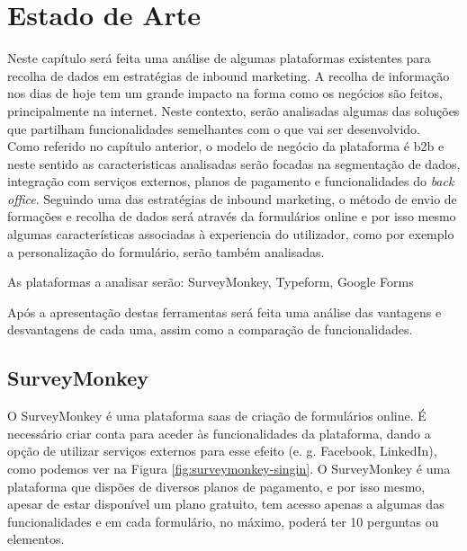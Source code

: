 \chapter{Estado de Arte}
\label{sec:estado-arte}

Neste capítulo será feita uma análise de algumas plataformas existentes para recolha de dados em estratégias de inbound marketing. A recolha de informação nos dias de hoje tem um grande impacto na forma como os negócios são feitos, principalmente na internet. Neste contexto, serão analisadas algumas das soluções que partilham funcionalidades semelhantes com o que vai ser desenvolvido.\\
Como referido no capítulo anterior, o modelo de negócio da plataforma é \gls{b2b} e neste sentido as caracteristicas analisadas serão focadas na segmentação de dados, integração com serviços externos, planos de pagamento e funcionalidades do \textit{back office}.
Seguindo uma das estratégias de inbound marketing, o método de envio de formações e recolha de dados será através da formulários online e por isso mesmo algumas características associadas à experiencia do utilizador, como por exemplo a personalização do formulário, serão também analisadas.


As plataformas a analisar serão: SurveyMonkey\cite{surveymonkey}, Typeform\cite{typeform}, Google Forms\cite{googleform}

Após a apresentação destas ferramentas será feita uma análise das vantagens e desvantagens de cada uma, assim como a comparação de funcionalidades.


\section{SurveyMonkey}
\label{surveyMonkey}

O SurveyMonkey é uma plataforma \acrfull{saas} de criação de formulários online. É necessário criar conta para aceder às funcionalidades da plataforma, dando a opção de utilizar serviços externos para esse efeito (e. g. Facebook\cite{face}, LinkedIn\cite{linkedin}), como podemos ver na Figura \ref{fig:surveymonkey-singin}. O SurveyMonkey é uma plataforma que dispões de diversos planos de pagamento, e por isso mesmo, apesar de estar disponível um plano gratuito, tem acesso apenas a algumas das funcionalidades e em cada formulário, no máximo, poderá ter 10 perguntas ou elementos. 

